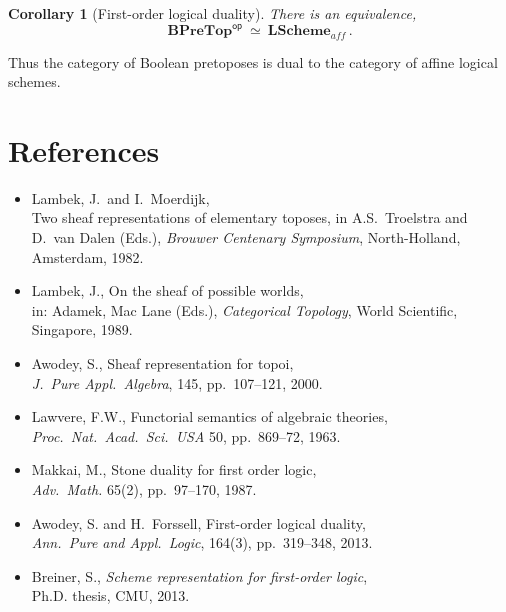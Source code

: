 \documentclass[11pt]{article}
\newtheorem{corollary}[theorem]{Corollary}
\theoremstyle{remark}
\theoremstyle{definition}
\begin{document}
\begin{corollary}[First-order logical duality]
There is an equivalence,
\[
\mathbf{BPreTop}^{\mathsf{op}} \ \simeq\ \mathbf{LScheme}_{aff}\,.
\]
\end{corollary}

Thus the category of Boolean pretoposes is dual to the category of affine logical schemes.


\section{References}

\begin{itemize}
\item Lambek, J.\ and I.~Moerdijk,\\
 Two sheaf representations of elementary toposes, in 
 A.S.\ Troelstra and D.\ van Dalen (Eds.), \emph{Brouwer Centenary Symposium}, North-Holland, Amsterdam, 1982.
\item Lambek, J., On the sheaf of possible worlds,\\
 in: Adamek, Mac Lane (Eds.), \emph{Categorical Topology}, World Scientific, Singapore, 1989.
\item Awodey, S., Sheaf representation for topoi,\\
 \emph{J.\ Pure Appl.\ Algebra}, 145, pp.~107--121, 2000.
\item Lawvere, F.W., Functorial semantics of algebraic theories,  \emph{Proc.\ Nat.\ Acad.\ Sci.\ USA} 50, pp.~869--72, 1963.
\item Makkai, M., Stone duality for first order logic,\\
 \emph{Adv.\ Math.} 65(2), pp.~97--170,  1987.
\item Awodey, S. and H.~Forssell, First-order logical duality,\\
 \emph{Ann.\ Pure and Appl.\ Logic}, 164(3), pp.~319--348, 2013.
\item Breiner, S., \emph{Scheme representation for first-order logic},\\
 Ph.D. thesis, CMU, 2013.
\end{itemize}









\end{document}
